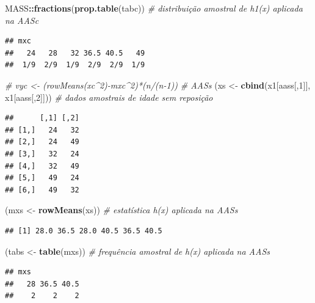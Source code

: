\documentclass[
]{book}
\newenvironment{Shaded}{\begin{snugshade}}{\end{snugshade}}
\newcommand{\CommentTok}[1]{\textcolor[rgb]{0.56,0.35,0.01}{\textit{#1}}}
\newcommand{\DecValTok}[1]{\textcolor[rgb]{0.00,0.00,0.81}{#1}}
\newcommand{\KeywordTok}[1]{\textcolor[rgb]{0.13,0.29,0.53}{\textbf{#1}}}
\newcommand{\NormalTok}[1]{#1}
\newcommand{\OperatorTok}[1]{\textcolor[rgb]{0.81,0.36,0.00}{\textbf{#1}}}
\newcommand{\StringTok}[1]{\textcolor[rgb]{0.31,0.60,0.02}{#1}}
\theoremstyle{definition}
\theoremstyle{definition}
\theoremstyle{definition}
\theoremstyle{remark}
\begin{document}
\begin{Shaded}
\begin{Highlighting}[]
\NormalTok{MASS}\OperatorTok{::}\KeywordTok{fractions}\NormalTok{(}\KeywordTok{prop.table}\NormalTok{(tabc)) }\CommentTok{\# distribuição amostral de h1(x) aplicada na AASc}
\end{Highlighting}
\end{Shaded}

\begin{verbatim}
## mxc
##   24   28   32 36.5 40.5   49 
##  1/9  2/9  1/9  2/9  2/9  1/9
\end{verbatim}

\begin{Shaded}
\begin{Highlighting}[]
\CommentTok{\# vyc \textless{}{-} (rowMeans(xc\^{}2){-}mxc\^{}2)*(n/(n{-}1))}
\CommentTok{\# AASs}
\NormalTok{(xs \textless{}{-}}\StringTok{ }\KeywordTok{cbind}\NormalTok{(x1[aass[,}\DecValTok{1}\NormalTok{]], x1[aass[,}\DecValTok{2}\NormalTok{]])) }\CommentTok{\# dados amostrais de idade sem reposição}
\end{Highlighting}
\end{Shaded}

\begin{verbatim}
##      [,1] [,2]
## [1,]   24   32
## [2,]   24   49
## [3,]   32   24
## [4,]   32   49
## [5,]   49   24
## [6,]   49   32
\end{verbatim}

\begin{Shaded}
\begin{Highlighting}[]
\NormalTok{(mxs \textless{}{-}}\StringTok{ }\KeywordTok{rowMeans}\NormalTok{(xs))       }\CommentTok{\# estatística h(x) aplicada na AASs}
\end{Highlighting}
\end{Shaded}

\begin{verbatim}
## [1] 28.0 36.5 28.0 40.5 36.5 40.5
\end{verbatim}

\begin{Shaded}
\begin{Highlighting}[]
\NormalTok{(tabs \textless{}{-}}\StringTok{ }\KeywordTok{table}\NormalTok{(mxs))        }\CommentTok{\# frequência amostral de h(x) aplicada na AASs}
\end{Highlighting}
\end{Shaded}

\begin{verbatim}
## mxs
##   28 36.5 40.5 
##    2    2    2
\end{verbatim}
\end{document}
